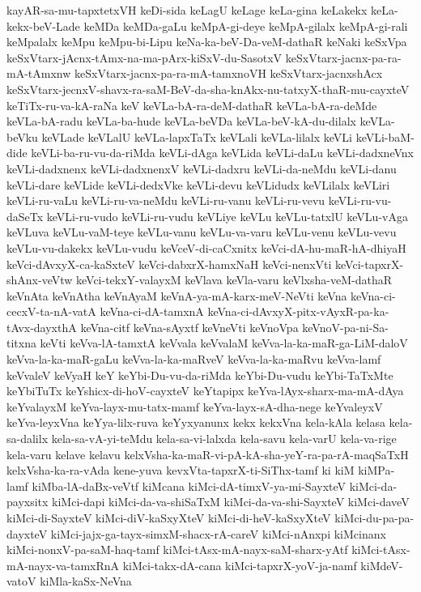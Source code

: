 {kayAR-sa-mu-tapxtetxVH
keDi-sida
keLagU
keLage
keLa-gina
keLakekx
keLa-kekx-beV-Lade
keMDa
keMDa-gaLu
keMpA-gi-deye
keMpA-gilalx
keMpA-gi-rali
keMpalalx
keMpu
keMpu-bi-Lipu
keNa-ka-beV-Da-veM-dathaR
keNaki
keSxVpa
keSxVtarx-jAcnx-tAmx-na-ma-pArx-kiSxV-du-SasotxV
keSxVtarx-jacnx-pa-ra-mA-tAmxnw
keSxVtarx-jacnx-pa-ra-mA-tamxnoVH
keSxVtarx-jacnxshAcx
keSxVtarx-jecnxV-shavx-ra-saM-BeV-da-sha-knAkx-nu-tatxyX-thaR-mu-cayxteV
keTiTx-ru-va-kA-raNa
keV
keVLa-bA-ra-deM-dathaR
keVLa-bA-ra-deMde
keVLa-bA-radu
keVLa-ba-hude
keVLa-beVDa
keVLa-beV-kA-du-dilalx
keVLa-beVku
keVLade
keVLalU
keVLa-lapxTaTx
keVLali
keVLa-lilalx
keVLi
keVLi-baM-dide
keVLi-ba-ru-vu-da-riMda
keVLi-dAga
keVLida
keVLi-daLu
keVLi-dadxneVnx
keVLi-dadxnenx
keVLi-dadxnenxV
keVLi-dadxru
keVLi-da-neMdu
keVLi-danu
keVLi-dare
keVLide
keVLi-dedxVke
keVLi-devu
keVLidudx
keVLilalx
keVLiri
keVLi-ru-vaLu
keVLi-ru-va-neMdu
keVLi-ru-vanu
keVLi-ru-vevu
keVLi-ru-vu-daSeTx
keVLi-ru-vudo
keVLi-ru-vudu
keVLiye
keVLu
keVLu-tatxlU
keVLu-vAga
keVLuva
keVLu-vaM-teye
keVLu-vanu
keVLu-va-varu
keVLu-venu
keVLu-vevu
keVLu-vu-dakekx
keVLu-vudu
keVceV-di-caCxnitx
keVci-dA-hu-maR-hA-dhiyaH
keVci-dAvxyX-ca-kaSxteV
keVci-dabxrX-hamxNaH
keVci-nenxVti
keVci-tapxrX-shAnx-veVtw
keVci-tekxY-valayxM
keVlava
keVla-varu
keVlxsha-veM-dathaR
keVnAta
keVnAtha
keVnAyaM
keVnA-ya-mA-karx-meV-NeVti
keVna
keVna-ci-cecxV-ta-nA-vatA
keVna-ci-dA-tamxnA
keVna-ci-dAvxyX-pitx-vAyxR-pa-ka-tAvx-dayxthA
keVna-citf
keVna-sAyxtf
keVneVti
keVnoVpa
keVnoV-pa-ni-Sa-titxna
keVti
keVva-lA-tamxtA
keVvala
keVvalaM
keVva-la-ka-maR-ga-LiM-daloV
keVva-la-ka-maR-gaLu
keVva-la-ka-maRveV
keVva-la-ka-maRvu
keVva-lamf
keVvaleV
keVyaH
keY
keYbi-Du-vu-da-riMda
keYbi-Du-vudu
keYbi-TaTxMte
keYbiTuTx
keYshicx-di-hoV-cayxteV
keYtapipx
keYva-lAyx-sharx-ma-mA-dAya
keYvalayxM
keYva-layx-mu-tatx-mamf
keYva-layx-sA-dha-nege
keYvaleyxV
keYva-leyxVna
keYya-lilx-ruva
keYyxyanunx
kekx
kekxVna
kela-kAla
kelasa
kela-sa-dalilx
kela-sa-vA-yi-teMdu
kela-sa-vi-lalxda
kela-savu
kela-varU
kela-va-rige
kela-varu
kelave
kelavu
kelxVsha-ka-maR-vi-pA-kA-sha-yeY-ra-pa-rA-maqSaTxH
kelxVsha-ka-ra-vAda
kene-yuva
kevxVta-tapxrX-ti-SiThx-tamf
ki
kiM
kiMPa-lamf
kiMba-lA-daBx-veVtf
kiMcana
kiMci-dA-timxV-ya-mi-SayxteV
kiMci-da-payxsitx
kiMci-dapi
kiMci-da-va-shiSaTxM
kiMci-da-va-shi-SayxteV
kiMci-daveV
kiMci-di-SayxteV
kiMci-diV-kaSxyXteV
kiMci-di-heV-kaSxyXteV
kiMci-du-pa-pa-dayxteV
kiMci-jajx-ga-tayx-simxM-shacx-rA-careV
kiMci-nAnxpi
kiMcinanx
kiMci-nonxV-pa-saM-haq-tamf
kiMci-tAsx-mA-nayx-saM-sharx-yAtf
kiMci-tAsx-mA-nayx-va-tamxRnA
kiMci-takx-dA-cana
kiMci-tapxrX-yoV-ja-namf
kiMdeV-vatoV
kiMla-kaSx-NeVna
}
